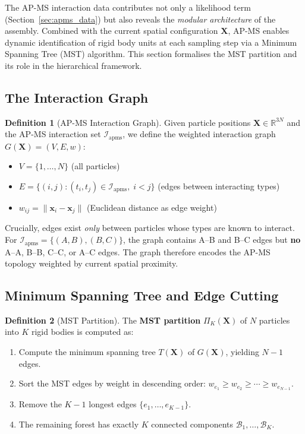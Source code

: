 \documentclass[11pt,a4paper]{article}
\newcommand{\bx}{\mathbf{x}}
\newcommand{\bX}{\mathbf{X}}
\newcommand{\R}{\mathbb{R}}
\theoremstyle{definition}
\newtheorem{definition}{Definition}
\begin{document}
The AP-MS interaction data contributes not only a likelihood term (Section~\ref{sec:apms_data}) but also reveals the \textit{modular architecture} of the assembly. Combined with the current spatial configuration $\bX$, AP-MS enables dynamic identification of rigid body units at each sampling step via a Minimum Spanning Tree (MST) algorithm. This section formalises the MST partition and its role in the hierarchical framework.

\subsection{The Interaction Graph}

\begin{definition}[AP-MS Interaction Graph]
Given particle positions $\bX \in \R^{3N}$ and the AP-MS interaction set $\mathcal{I}_{\text{apms}}$, we define the weighted interaction graph $G(\bX) = (V, E, w)$:
\begin{itemize}
    \item $V = \{1, \ldots, N\}$ \hfill (all particles)
    \item $E = \{(i, j) : (t_i, t_j) \in \mathcal{I}_{\text{apms}},\; i < j\}$ \hfill (edges between interacting types)
    \item $w_{ij} = \|\bx_i - \bx_j\|$ \hfill (Euclidean distance as edge weight)
\end{itemize}
\end{definition}

Crucially, edges exist \textit{only} between particles whose types are known to interact. For $\mathcal{I}_{\text{apms}} = \{(A,B), (B,C)\}$, the graph contains A--B and B--C edges but \textbf{no} A--A, B--B, C--C, or A--C edges. The graph therefore encodes the AP-MS topology weighted by current spatial proximity.

\subsection{Minimum Spanning Tree and Edge Cutting}

\begin{definition}[MST Partition]
The \textbf{MST partition} $\Pi_K(\bX)$ of $N$ particles into $K$ rigid bodies is computed as:
\begin{enumerate}
    \item Compute the minimum spanning tree $T(\bX)$ of $G(\bX)$, yielding $N - 1$ edges.
    \item Sort the MST edges by weight in descending order: $w_{e_1} \geq w_{e_2} \geq \cdots \geq w_{e_{N-1}}$.
    \item Remove the $K - 1$ longest edges $\{e_1, \ldots, e_{K-1}\}$.
    \item The remaining forest has exactly $K$ connected components $\mathcal{B}_1, \ldots, \mathcal{B}_K$.
\end{enumerate}
\end{definition}
\end{document}
